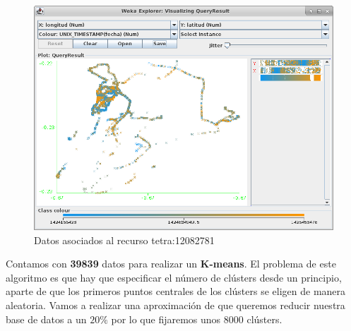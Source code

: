 \documentclass[a4paper, 12pt]{article}
\begin{document}
\begin{figure}[!htbp]
	\begin{center}
	\includegraphics[scale=.5]{wekaImportData.png}
	\end{center}
	\caption{Datos asociados al recurso tetra:12082781}
\end{figure}

Contamos con \textbf{39839} datos para realizar un \textbf{K-means}. El problema de este algoritmo es que hay que especificar el n\'umero de cl\'usters desde un principio, aparte de que los primeros puntos centrales de los cl\'usters se eligen de manera aleatoria. Vamos a realizar una aproximaci\'on de que queremos reducir nuestra base de datos a un $20\%$ por lo que fijaremos unos $8000$ cl\'usters. 
\end{document}
